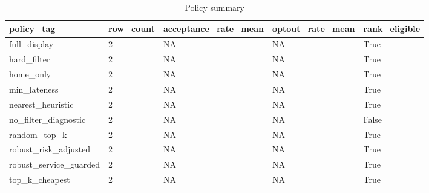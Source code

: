 \begin{table}[ht]
\centering
\begin{tabular}{lllll}
 \hline
policy\_tag & row\_count & acceptance\_rate\_mean & optout\_rate\_mean & rank\_eligible \\
 \hline
full\_display & 2 & NA & NA & True \\
hard\_filter & 2 & NA & NA & True \\
home\_only & 2 & NA & NA & True \\
min\_lateness & 2 & NA & NA & True \\
nearest\_heuristic & 2 & NA & NA & True \\
no\_filter\_diagnostic & 2 & NA & NA & False \\
random\_top\_k & 2 & NA & NA & True \\
robust\_risk\_adjusted & 2 & NA & NA & True \\
robust\_service\_guarded & 2 & NA & NA & True \\
top\_k\_cheapest & 2 & NA & NA & True \\
 \hline
\end{tabular}
\caption{Policy summary}
\end{table}
